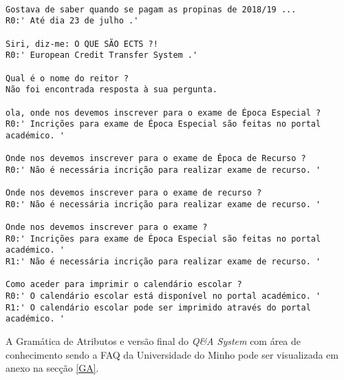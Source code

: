 \begin{verbatim}

Gostava de saber quando se pagam as propinas de 2018/19 ...
R0:' Até dia 23 de julho .'

Siri, diz-me: O QUE SÃO ECTS ?!
R0:' European Credit Transfer System .'

Qual é o nome do reitor ?
Não foi encontrada resposta à sua pergunta.

ola, onde nos devemos inscrever para o exame de Época Especial ?
R0:' Incrições para exame de Época Especial são feitas no portal académico. '

Onde nos devemos inscrever para o exame de Época de Recurso ?
R0:' Não é necessária incrição para realizar exame de recurso. '

Onde nos devemos inscrever para o exame de recurso ?
R0:' Não é necessária incrição para realizar exame de recurso. '

Onde nos devemos inscrever para o exame ?
R0:' Incrições para exame de Época Especial são feitas no portal académico. '
R1:' Não é necessária incrição para realizar exame de recurso. '

Como aceder para imprimir o calendário escolar ?
R0:' O calendário escolar está disponível no portal académico. '
R1:' O calendário escolar pode ser imprimido através do portal académico. '
\end{verbatim}



A Gramática de Atributos e versão final do \textit{Q\&A System} com área de conhecimento sendo a FAQ da Universidade do Minho pode ser visualizada em anexo na secção \ref{GA}.
 